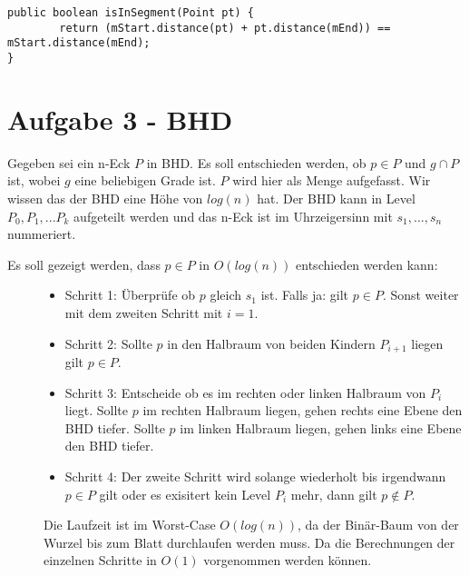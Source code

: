 \documentclass[a4paper]{article}
\begin{document}
\begin{lstlisting}
public boolean isInSegment(Point pt) {
        return (mStart.distance(pt) + pt.distance(mEnd)) == mStart.distance(mEnd);
}
\end{lstlisting}

\section*{Aufgabe 3 - BHD}

Gegeben sei ein n-Eck $P$ in BHD. Es soll entschieden werden, ob $ p \in P$ und $g \cap P$ ist, wobei $g$ eine beliebigen Grade ist. $P$ wird hier als Menge aufgefasst. Wir wissen das der BHD eine Höhe von $log(n)$ hat. Der BHD kann in Level $P_0, P_1, ... P_k$ aufgeteilt werden und das n-Eck ist im Uhrzeigersinn mit $s_1, ..., s_n$ nummeriert.

\begin{description}
	\item[Es soll gezeigt werden, dass $p \in P$ in $O(log(n))$ entschieden werden kann:]

\begin{itemize}

\item Schritt 1: Überprüfe ob $p$ gleich $s_1$ ist. Falls ja: gilt $p \in P$. Sonst weiter mit dem zweiten Schritt mit $i = 1$.

\item Schritt 2: Sollte $p$ in den Halbraum von beiden Kindern $P_{i+1}$ liegen gilt $p \in P$.

\item Schritt 3: Entscheide ob es im rechten oder linken Halbraum von $P_i$ liegt. Sollte $p$ im rechten Halbraum liegen, gehen rechts eine Ebene den BHD tiefer. Sollte $p$ im linken Halbraum liegen, gehen links eine Ebene den BHD tiefer. 

\item Schritt 4: Der zweite Schritt wird solange wiederholt bis irgendwann $p \in P$ gilt oder es exisitert kein Level $P_i$ mehr, dann gilt $p \notin P$.

\end{itemize}

Die Laufzeit ist im Worst-Case $O(log(n))$, da der Binär-Baum von der Wurzel bis zum Blatt durchlaufen werden muss. Da die Berechnungen der einzelnen Schritte in $O(1)$ vorgenommen werden können.


\end{description}
\end{document}
